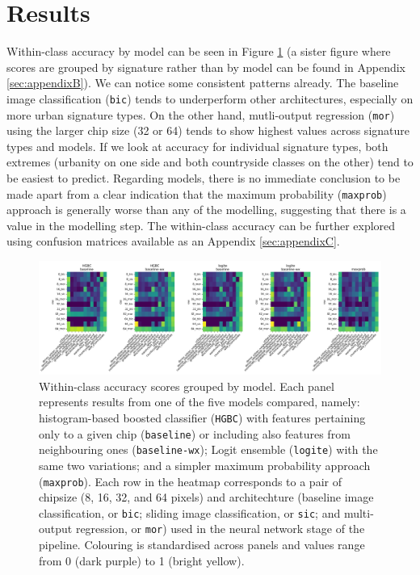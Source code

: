\section{Results} %
\label{sec:results}



Within-class accuracy by model can be seen in Figure \ref{fig:wc_accuracy_x_model} (a
sister figure where scores are grouped by signature rather than by model can be found in
Appendix \ref{sec:appendixB}). We can notice some consistent patterns already. The
baseline image classification (\texttt{bic}) tends to underperform other architectures,
especially on more urban signature types. On the other hand, mutli-output regression (\texttt{mor})
using the larger chip size (32 or 64) tends to show highest values across signature
types and models. If we look at accuracy for individual signature types, both extremes
(urbanity on one side and both countryside classes on the other)
tend to be easiest to predict. Regarding models, there is no immediate conclusion to be
made apart from a clear indication that the maximum probability (\texttt{maxprob}) approach is generally
worse than any of the modelling, suggesting that there is a value in the modelling step.
The within-class accuracy can be further explored using confusion matrices available as an
Appendix \ref*{sec:appendixC}.


\begin{figure}
    \centering
    \includegraphics[width=1.0\linewidth]{fig/wc_accuracy_x_model.png}
    \caption{\footnotesize Within-class accuracy scores grouped by model. Each panel
    represents results from one of the five models compared, namely:
    histogram-based boosted classifier (\texttt{HGBC}) with features
    pertaining only to a given chip (\texttt{baseline}) or including also features
    from neighbouring ones (\texttt{baseline-wx}); Logit ensemble
    (\texttt{logite}) with the same two variations; and a simpler maximum
    probability approach (\texttt{maxprob}). Each row in the heatmap
    corresponds to a pair of chipsize (8, 16, 32, and 64 pixels)
    and architechture (baseline image classification, or \texttt{bic}; sliding
            image classification, or \texttt{sic}; and multi-output
    regression, or \texttt{mor}) used in the neural network stage of the
    pipeline. Colouring is standardised across panels and values range from
    0 (dark purple) to 1 (bright yellow).}
    \label{fig:wc_accuracy_x_model}
\end{figure}

